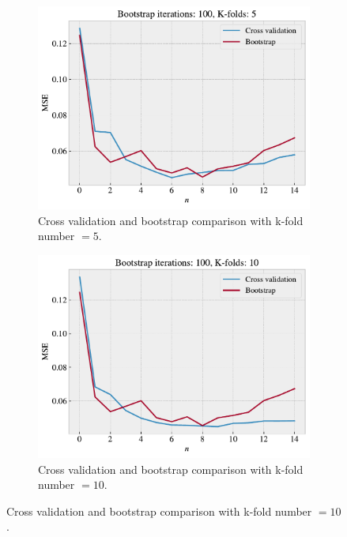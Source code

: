 \documentclass[norsk,a4paper,12pt]{scrartcl}
\begin{document}
\begin{figure}[H]
     \centering
     \begin{subfigure}[b]{0.49\textwidth}
         \centering
         \includegraphics[width=\textwidth]{figures/CV_boot_comparison_with_k5.pdf}
         \caption{Cross validation and bootstrap comparison with k-fold number $=5$. }
         \label{fig:cv_b_5}
     \end{subfigure}
     \hfill
     \begin{subfigure}[b]{0.49\textwidth}
         \centering
         \includegraphics[width=\textwidth]{figures/CV_boot_comparison_with_k10.pdf}
         \caption{Cross validation and bootstrap comparison with k-fold number $=10$. }
         \label{fig:cv_b_10}

\end{subfigure}
\end{figure}
\end{document}
